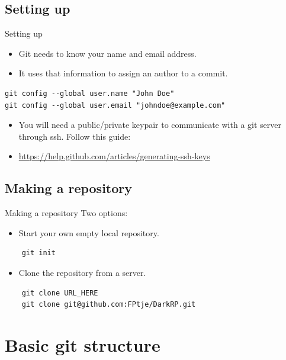 \documentclass[10pt,a4paper]{beamer}
\begin{document}
\subsection{Setting up}
\begin{frame}[fragile]{Setting up}
\begin{itemize}
\item Git needs to know your name and email address.
\item It uses that information to assign an author to a commit.
\end{itemize}

\begin{verbatim}
git config --global user.name "John Doe"
git config --global user.email "johndoe@example.com"
\end{verbatim}

\begin{itemize}
\item You will need a public/private keypair to communicate with a git server through ssh. Follow this guide:
\item \href{http://git-scm.com/downloads/guis}{\color{blue}https://help.github.com/articles/generating-ssh-keys}
\end{itemize}
\end{frame}

\subsection{Making a repository}
\begin{frame}[fragile]{Making a repository}
Two options:

\begin{itemize}
\item Start your own empty local repository.
\end{itemize}

	\begin{verbatim}
	git init
	\end{verbatim}

\begin{itemize}
\item Clone the repository from a server.
\end{itemize}

	\begin{verbatim}
	git clone URL_HERE
	git clone git@github.com:FPtje/DarkRP.git
	\end{verbatim}
\end{frame}


\section{Basic git structure}
\end{document}
